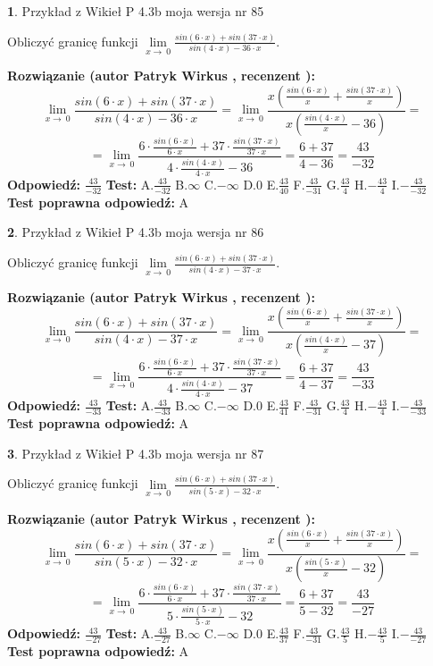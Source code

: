 \documentclass[12pt, a4paper]{article}
\theoremstyle{definition} %
\newtheorem{zad}{}
\newcommand{\zadStart}[1]{\begin{zad}#1\newline}
\newcommand{\zadStop}{\end{zad}}
\newcommand{\rozwStart}[2]{\noindent \textbf{Rozwiązanie (autor #1 , recenzent #2): }\newline}
\newcommand{\rozwStop}{\newline}
\newcommand{\odpStart}{\noindent \textbf{Odpowiedź:}\newline}
\newcommand{\odpStop}{\newline}
\newcommand{\testStart}{\noindent \textbf{Test:}\newline}
\newcommand{\testStop}{\newline}
\newcommand{\kluczStart}{\noindent \textbf{Test poprawna odpowiedź:}\newline}
\newcommand{\kluczStop}{\newline}
\begin{document}
\zadStart{Przykład z Wikieł P 4.3b moja wersja nr 85}


Obliczyć granicę funkcji $\lim\limits_{x\to\ 0}\frac{sin(6 \cdot x)+sin(37 \cdot x)}{sin(4 \cdot x)-36 \cdot x}$.
\zadStop
\rozwStart{Patryk Wirkus}{}
$$\lim\limits_{x\to\ 0}\frac{sin(6 \cdot x)+sin(37 \cdot x)}{sin(4 \cdot x)-36 \cdot x}=\lim\limits_{x\to\ 0}\frac{x(\frac{sin(6 \cdot x)}{x}+\frac{sin(37 \cdot x)}{x})}{x(\frac{sin(4 \cdot x)}{x}-36)}=$$
$$=\lim\limits_{x\to\ 0}\frac{6 \cdot \frac{sin(6 \cdot x)}{6 \cdot x}+37 \cdot \frac{sin(37 \cdot x)}{37 \cdot x}}{4 \cdot \frac{sin(4 \cdot x)}{4 \cdot x}-36}=\frac{6+37}{4-36} = \frac{43}{-32}$$
\rozwStop
\odpStart
$\frac{43}{-32}$
\odpStop
\testStart
A.$\frac{43}{-32}$
B.$\infty$
C.$-\infty$
D.$0$
E.$\frac{43}{40}$
F.$\frac{43}{-31}$
G.$\frac{43}{4}$
H.$-\frac{43}{4}$
I.$-\frac{43}{-32}$
\testStop
\kluczStart
A
\kluczStop



\zadStart{Przykład z Wikieł P 4.3b moja wersja nr 86}


Obliczyć granicę funkcji $\lim\limits_{x\to\ 0}\frac{sin(6 \cdot x)+sin(37 \cdot x)}{sin(4 \cdot x)-37 \cdot x}$.
\zadStop
\rozwStart{Patryk Wirkus}{}
$$\lim\limits_{x\to\ 0}\frac{sin(6 \cdot x)+sin(37 \cdot x)}{sin(4 \cdot x)-37 \cdot x}=\lim\limits_{x\to\ 0}\frac{x(\frac{sin(6 \cdot x)}{x}+\frac{sin(37 \cdot x)}{x})}{x(\frac{sin(4 \cdot x)}{x}-37)}=$$
$$=\lim\limits_{x\to\ 0}\frac{6 \cdot \frac{sin(6 \cdot x)}{6 \cdot x}+37 \cdot \frac{sin(37 \cdot x)}{37 \cdot x}}{4 \cdot \frac{sin(4 \cdot x)}{4 \cdot x}-37}=\frac{6+37}{4-37} = \frac{43}{-33}$$
\rozwStop
\odpStart
$\frac{43}{-33}$
\odpStop
\testStart
A.$\frac{43}{-33}$
B.$\infty$
C.$-\infty$
D.$0$
E.$\frac{43}{41}$
F.$\frac{43}{-31}$
G.$\frac{43}{4}$
H.$-\frac{43}{4}$
I.$-\frac{43}{-33}$
\testStop
\kluczStart
A
\kluczStop



\zadStart{Przykład z Wikieł P 4.3b moja wersja nr 87}


Obliczyć granicę funkcji $\lim\limits_{x\to\ 0}\frac{sin(6 \cdot x)+sin(37 \cdot x)}{sin(5 \cdot x)-32 \cdot x}$.
\zadStop
\rozwStart{Patryk Wirkus}{}
$$\lim\limits_{x\to\ 0}\frac{sin(6 \cdot x)+sin(37 \cdot x)}{sin(5 \cdot x)-32 \cdot x}=\lim\limits_{x\to\ 0}\frac{x(\frac{sin(6 \cdot x)}{x}+\frac{sin(37 \cdot x)}{x})}{x(\frac{sin(5 \cdot x)}{x}-32)}=$$
$$=\lim\limits_{x\to\ 0}\frac{6 \cdot \frac{sin(6 \cdot x)}{6 \cdot x}+37 \cdot \frac{sin(37 \cdot x)}{37 \cdot x}}{5 \cdot \frac{sin(5 \cdot x)}{5 \cdot x}-32}=\frac{6+37}{5-32} = \frac{43}{-27}$$
\rozwStop
\odpStart
$\frac{43}{-27}$
\odpStop
\testStart
A.$\frac{43}{-27}$
B.$\infty$
C.$-\infty$
D.$0$
E.$\frac{43}{37}$
F.$\frac{43}{-31}$
G.$\frac{43}{5}$
H.$-\frac{43}{5}$
I.$-\frac{43}{-27}$
\testStop
\kluczStart
A
\kluczStop
\end{document}
